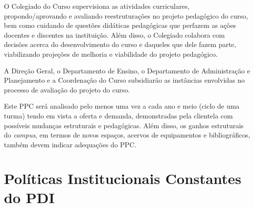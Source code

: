 \documentclass[
	12pt,				%
	openright,			%
	twoside,			%
	a4paper,			%
	chapter=TITLE,		%
	english,			%
	french,				%
	spanish,			%
	brazil,				%
	]{abntex2}
\begin{document}
O Colegiado do Curso supervisiona as atividades curriculares, propondo/aprovando e avaliando reestruturações no projeto pedagógico do curso, bem como cuidando de questões didáticas pedagógicas que perfazem as ações docentes e discentes na instituição. Além disso, o Colegiado colabora com decisões acerca do desenvolvimento do curso e daqueles que dele fazem parte, viabilizando projeções de melhoria e viabilidade do projeto pedagógico.

A Direção Geral, o Departamento de Ensino, o Departamento de Administração e Planejamento e a Coordenação do Curso subsidiarão as instâncias envolvidas no processo de avaliação do projeto do curso.

Este PPC será analisado pelo menos uma vez a cada ano e meio (ciclo de uma turma) tendo em vista a oferta e demanda, 
demonstradas pela clientela com possíveis mudanças estruturais e pedagógicas. Além disso, os ganhos estruturais do \textit{campus}, em termos de novos espaços, acervos de equipamentos e bibliográficos, também devem indicar adequações do PPC.


\chapter{Políticas Institucionais Constantes do PDI}%
\end{document}
